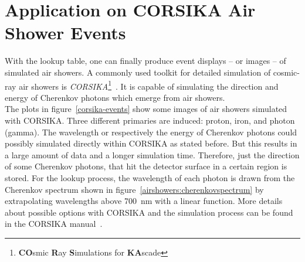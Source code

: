 \section{Application on CORSIKA Air Shower Events}

With the lookup table, one can finally produce event displays -- or images -- of simulated air showers. A commonly used toolkit for detailed simulation of cosmic-ray air showers is \textit{CORSIKA}\footnote{\textbf{CO}smic \textbf{R}ay \textbf{S}imulations for \textbf{KA}scade}~\cite{corsika:website}. It is capable of simulating the direction and energy of Cherenkov photons which emerge from air showers.\\

The plots in figure~\ref{corsika-events} show some images of air showers simulated with CORSIKA. Three different primaries are induced: proton, iron, and photon (gamma). The wavelength or respectively the energy of Cherenkov photons could possibly simulated directly within CORSIKA as stated before. But this results in a large amount of data and a longer simulation time. Therefore, just the direction of some Cherenkov photons, that hit the detector surface in a certain region is stored. For the lookup process, the wavelength of each photon is drawn from the Cherenkov spectrum shown in figure~\ref{airshowers:cherenkovspectrum} by extrapolating wavelengths above \SI{700}{\nano\meter} with a linear function. More details about possible options with CORSIKA and the simulation process can be found in the CORSIKA manual~\cite{corsika:manual}.

